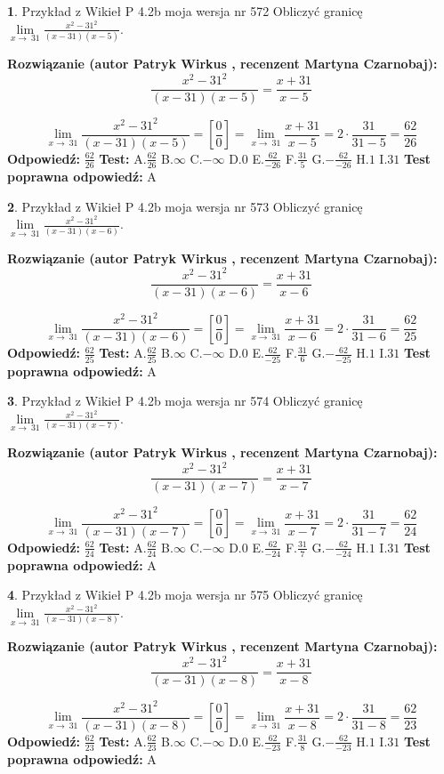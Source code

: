 \documentclass[12pt, a4paper]{article}
\theoremstyle{definition} %
\newtheorem{zad}{}
\newcommand{\zadStart}[1]{\begin{zad}#1\newline}
\newcommand{\zadStop}{\end{zad}}
\newcommand{\rozwStart}[2]{\noindent \textbf{Rozwiązanie (autor #1 , recenzent #2): }\newline}
\newcommand{\rozwStop}{\newline}
\newcommand{\odpStart}{\noindent \textbf{Odpowiedź:}\newline}
\newcommand{\odpStop}{\newline}
\newcommand{\testStart}{\noindent \textbf{Test:}\newline}
\newcommand{\testStop}{\newline}
\newcommand{\kluczStart}{\noindent \textbf{Test poprawna odpowiedź:}\newline}
\newcommand{\kluczStop}{\newline}
\begin{document}
\zadStart{Przykład z Wikieł P 4.2b moja wersja nr 572}
Obliczyć granicę $\lim\limits_{x\to\ 31}\frac{x^{2}-31^{2}}{(x-31)(x-5)}$.
\zadStop
\rozwStart{Patryk Wirkus}{Martyna Czarnobaj}
$$\frac{x^{2}-31^{2}}{(x-31)(x-5)}=\frac{x+31}{x-5}$$

$$\lim\limits_{x\to\ 31}\frac{x^{2}-31^{2}}{(x-31)(x-5)}=[\frac{0}{0}]=\lim\limits_{x\to\ 31}\frac{x+31}{x-5}=2 \cdot \frac{31}{31-5} = \frac{62}{26}$$
\rozwStop
\odpStart
$\frac{62}{26}$
\odpStop
\testStart
A.$\frac{62}{26}$
B.$\infty$
C.$-\infty$
D.$0$
E.$\frac{62}{-26}$
F.$\frac{31}{5}$
G.$-\frac{62}{-26}$
H.$1$
I.$31$
\testStop
\kluczStart
A
\kluczStop



\zadStart{Przykład z Wikieł P 4.2b moja wersja nr 573}
Obliczyć granicę $\lim\limits_{x\to\ 31}\frac{x^{2}-31^{2}}{(x-31)(x-6)}$.
\zadStop
\rozwStart{Patryk Wirkus}{Martyna Czarnobaj}
$$\frac{x^{2}-31^{2}}{(x-31)(x-6)}=\frac{x+31}{x-6}$$

$$\lim\limits_{x\to\ 31}\frac{x^{2}-31^{2}}{(x-31)(x-6)}=[\frac{0}{0}]=\lim\limits_{x\to\ 31}\frac{x+31}{x-6}=2 \cdot \frac{31}{31-6} = \frac{62}{25}$$
\rozwStop
\odpStart
$\frac{62}{25}$
\odpStop
\testStart
A.$\frac{62}{25}$
B.$\infty$
C.$-\infty$
D.$0$
E.$\frac{62}{-25}$
F.$\frac{31}{6}$
G.$-\frac{62}{-25}$
H.$1$
I.$31$
\testStop
\kluczStart
A
\kluczStop



\zadStart{Przykład z Wikieł P 4.2b moja wersja nr 574}
Obliczyć granicę $\lim\limits_{x\to\ 31}\frac{x^{2}-31^{2}}{(x-31)(x-7)}$.
\zadStop
\rozwStart{Patryk Wirkus}{Martyna Czarnobaj}
$$\frac{x^{2}-31^{2}}{(x-31)(x-7)}=\frac{x+31}{x-7}$$

$$\lim\limits_{x\to\ 31}\frac{x^{2}-31^{2}}{(x-31)(x-7)}=[\frac{0}{0}]=\lim\limits_{x\to\ 31}\frac{x+31}{x-7}=2 \cdot \frac{31}{31-7} = \frac{62}{24}$$
\rozwStop
\odpStart
$\frac{62}{24}$
\odpStop
\testStart
A.$\frac{62}{24}$
B.$\infty$
C.$-\infty$
D.$0$
E.$\frac{62}{-24}$
F.$\frac{31}{7}$
G.$-\frac{62}{-24}$
H.$1$
I.$31$
\testStop
\kluczStart
A
\kluczStop



\zadStart{Przykład z Wikieł P 4.2b moja wersja nr 575}
Obliczyć granicę $\lim\limits_{x\to\ 31}\frac{x^{2}-31^{2}}{(x-31)(x-8)}$.
\zadStop
\rozwStart{Patryk Wirkus}{Martyna Czarnobaj}
$$\frac{x^{2}-31^{2}}{(x-31)(x-8)}=\frac{x+31}{x-8}$$

$$\lim\limits_{x\to\ 31}\frac{x^{2}-31^{2}}{(x-31)(x-8)}=[\frac{0}{0}]=\lim\limits_{x\to\ 31}\frac{x+31}{x-8}=2 \cdot \frac{31}{31-8} = \frac{62}{23}$$
\rozwStop
\odpStart
$\frac{62}{23}$
\odpStop
\testStart
A.$\frac{62}{23}$
B.$\infty$
C.$-\infty$
D.$0$
E.$\frac{62}{-23}$
F.$\frac{31}{8}$
G.$-\frac{62}{-23}$
H.$1$
I.$31$
\testStop
\kluczStart
A
\kluczStop
\end{document}
